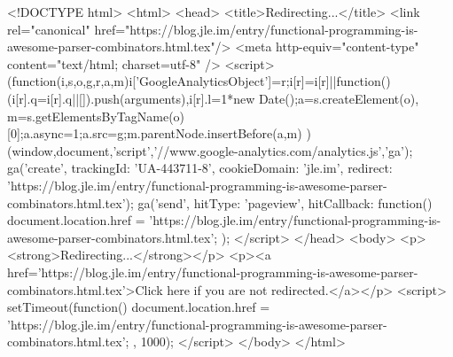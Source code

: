 <!DOCTYPE html>
<html>
<head>
<title>Redirecting...</title>
<link rel="canonical" href="https://blog.jle.im/entry/functional-programming-is-awesome-parser-combinators.html.tex"/>
<meta http-equiv="content-type" content="text/html; charset=utf-8" />
<script>
(function(i,s,o,g,r,a,m){i['GoogleAnalyticsObject']=r;i[r]=i[r]||function(){
(i[r].q=i[r].q||[]).push(arguments)},i[r].l=1*new Date();a=s.createElement(o),
m=s.getElementsByTagName(o)[0];a.async=1;a.src=g;m.parentNode.insertBefore(a,m)
})(window,document,'script','//www.google-analytics.com/analytics.js','ga');
ga('create', { trackingId: 'UA-443711-8', cookieDomain: 'jle.im', redirect: 'https://blog.jle.im/entry/functional-programming-is-awesome-parser-combinators.html.tex'});
ga('send', { hitType: 'pageview', hitCallback: function() { document.location.href = 'https://blog.jle.im/entry/functional-programming-is-awesome-parser-combinators.html.tex'; } });
</script>
</head>
<body>
  <p><strong>Redirecting...</strong></p>
  <p><a href='https://blog.jle.im/entry/functional-programming-is-awesome-parser-combinators.html.tex'>Click here if you are not redirected.</a></p>
  <script>
    setTimeout(function() { document.location.href = 'https://blog.jle.im/entry/functional-programming-is-awesome-parser-combinators.html.tex'; }, 1000);
  </script>
</body>
</html>
